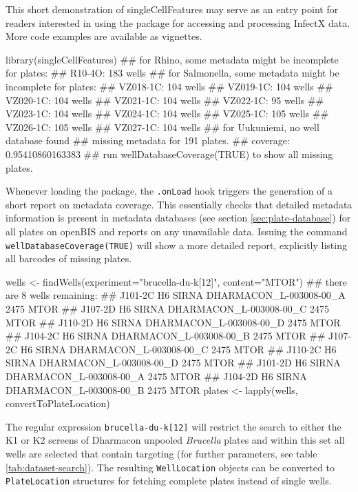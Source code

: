 

This short demonstration of singleCellFeatures may serve as an entry point for readers interested in using the package for accessing and processing InfectX data. More code examples are available as vignettes. 

\begin{rflow}
library(singleCellFeatures)
## for Rhino, some metadata might be incomplete for plates:
##   R10-4O: 183 wells
## for Salmonella, some metadata might be incomplete for plates:
##   VZ018-1C: 104 wells
##   VZ019-1C: 104 wells
##   VZ020-1C: 104 wells
##   VZ021-1C: 104 wells
##   VZ022-1C: 95 wells
##   VZ023-1C: 104 wells
##   VZ024-1C: 104 wells
##   VZ025-1C: 105 wells
##   VZ026-1C: 105 wells
##   VZ027-1C: 104 wells
## for Uukuniemi, no well database found
## missing metadata for 191 plates.
## coverage: 0.95410860163383
## run wellDatabaseCoverage(TRUE) to show all missing plates.

\end{rflow}


Whenever loading the package, the \texttt{.onLoad} hook triggers the generation of a short report on metadata coverage. This essentially checks that detailed metadata information is present in metadata databases (see section \ref{sec:plate-database}) for all plates on openBIS and reports on any unavailable data. Issuing the command \texttt{wellDatabaseCoverage(TRUE)} will show a more detailed report, explicitly listing all barcodes of missing plates.

\begin{rflow}
wells  <- findWells(experiment="brucella-du-k[12]", content="MTOR")
## there are 8 wells remaining:
##   J101-2C  H6   SIRNA  DHARMACON_L-003008-00_A  2475  MTOR
##   J107-2D  H6   SIRNA  DHARMACON_L-003008-00_C  2475  MTOR
##   J110-2D  H6   SIRNA  DHARMACON_L-003008-00_D  2475  MTOR
##   J104-2C  H6   SIRNA  DHARMACON_L-003008-00_B  2475  MTOR
##   J107-2C  H6   SIRNA  DHARMACON_L-003008-00_C  2475  MTOR
##   J110-2C  H6   SIRNA  DHARMACON_L-003008-00_D  2475  MTOR
##   J101-2D  H6   SIRNA  DHARMACON_L-003008-00_A  2475  MTOR
##   J104-2D  H6   SIRNA  DHARMACON_L-003008-00_B  2475  MTOR
plates <- lapply(wells, convertToPlateLocation)

\end{rflow}


The regular expression \texttt{brucella-du-k[12]} will restrict the search to either the K1 or K2 screens of Dharmacon unpooled \textit{Brucella} plates and within this set all wells are selected that contain  targeting  (for further parameters, see table \ref{tab:dataset-search}). The resulting \texttt{WellLocation} objects can be converted to \texttt{PlateLocation} structures for fetching complete plates instead of single wells.

